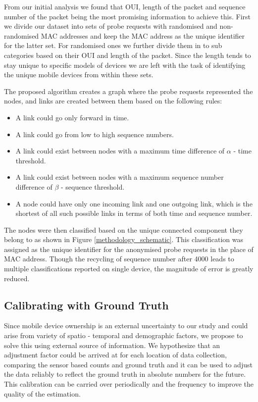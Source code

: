 From our initial analysis we found that OUI, length of the packet and sequence number of the packet being the most promising information to achieve this.
First we divide our dataset into sets of probe requests with randomised and non-randomised MAC addresses and keep the MAC address as the unique identifier for the latter set. 
For randomised ones we further divide them in to sub categories based on their OUI and length of the packet.
Since the length tends to stay unique to specific models of devices we are left with the task of identifying the unique mobile devices from within these sets.

The proposed algorithm creates a graph where the probe requests represented the nodes, and links are created between them based on the following rules: 
\begin{itemize}
	\item A link could go only forward in time. 
	\item A link could go from low to high sequence numbers.
	\item A link could exist between nodes with a maximum time difference of $\alpha$ - time threshold.
	\item A link could exist between nodes with a maximum sequence number difference of $\beta$ - sequence threshold.
	\item A node could have only one incoming link and one outgoing link, which is the shortest of all such possible links in terms of both time and sequence number.
\end{itemize}
The nodes were then classified based on the unique connected component they belong to as shown in Figure \ref{methodology_schematic}.
This classification was assigned as the unique identifier for the anonymised probe requests in the place of MAC address.
Though the recycling of sequence number after 4000 leads to multiple classifications reported on single device, the magnitude of error is greatly reduced. 

\subsection{Calibrating with Ground Truth}
Since mobile device ownership is an external uncertainty to our study and could arise from variety of spatio - temporal and demographic factors, we propose to solve this using external source of information.
We hypothesize that an adjustment factor could be arrived at for each location of data collection, comparing the sensor based counts and ground truth and it can be used to adjust the data reliably to reflect the ground truth in absolute numbers for the future.
This calibration can be carried over periodically and the frequency to improve the quality of the estimation.
